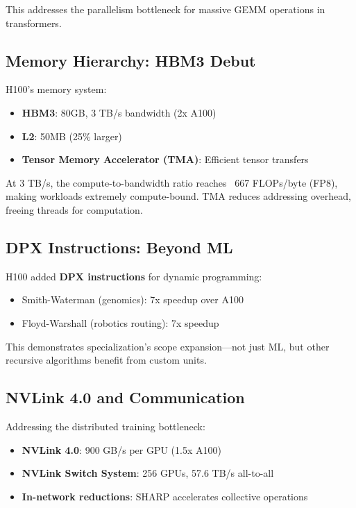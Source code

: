 \documentclass{article}
\begin{document}
This addresses the parallelism bottleneck for massive GEMM operations in transformers.

\subsection{Memory Hierarchy: HBM3 Debut}

H100's memory system:
\begin{itemize}
\item \textbf{HBM3}: 80GB, 3 TB/s bandwidth (2x A100)
\item \textbf{L2}: 50MB (25\% larger)
\item \textbf{Tensor Memory Accelerator (TMA)}: Efficient tensor transfers
\end{itemize}

At 3 TB/s, the compute-to-bandwidth ratio reaches ~667 FLOPs/byte (FP8), making workloads extremely compute-bound. TMA reduces addressing overhead, freeing threads for computation.

\subsection{DPX Instructions: Beyond ML}

H100 added \textbf{DPX instructions} for dynamic programming:
\begin{itemize}
\item Smith-Waterman (genomics): 7x speedup over A100
\item Floyd-Warshall (robotics routing): 7x speedup
\end{itemize}

This demonstrates specialization's scope expansion—not just ML, but other recursive algorithms benefit from custom units.

\subsection{NVLink 4.0 and Communication}

Addressing the distributed training bottleneck:
\begin{itemize}
\item \textbf{NVLink 4.0}: 900 GB/s per GPU (1.5x A100)
\item \textbf{NVLink Switch System}: 256 GPUs, 57.6 TB/s all-to-all
\item \textbf{In-network reductions}: SHARP accelerates collective operations
\end{itemize}
\end{document}

